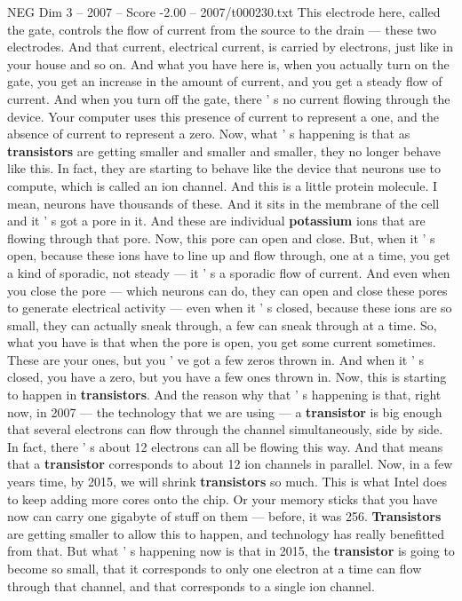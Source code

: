\begin{textsample}{NEG Dim 3 – 2007 – Score -2.00 – 2007/t000230.txt}
This electrode here, called the gate, controls the flow of current from the source to the drain — these two electrodes.
And that current, electrical current, is carried by electrons, just like in your house and so on.
And what you have here is, when you actually turn on the gate, you get an increase in the amount of current, and you get a steady flow of current.
And when you turn off the gate, there ' s no current flowing through the device.
Your computer uses this presence of current to represent a one, and the absence of current to represent a zero.
Now, what ' s happening is that as \textbf{transistors} are getting smaller and smaller and smaller, they no longer behave like this.
In fact, they are starting to behave like the device that neurons use to compute, which is called an ion channel.
And this is a little protein molecule.
I mean, neurons have thousands of these.
And it sits in the membrane of the cell and it ' s got a pore in it.
And these are individual \textbf{potassium} ions that are flowing through that pore.
Now, this pore can open and close.
But, when it ' s open, because these ions have to line up and flow through, one at a time, you get a kind of sporadic, not steady — it ' s a sporadic flow of current.
And even when you close the pore — which neurons can do, they can open and close these pores to generate electrical activity — even when it ' s closed, because these ions are so small, they can actually sneak through, a few can sneak through at a time.
So, what you have is that when the pore is open, you get some current sometimes.
These are your ones, but you ' ve got a few zeros thrown in.
And when it ' s closed, you have a zero, but you have a few ones thrown in.
Now, this is starting to happen in \textbf{transistors}.
And the reason why that ' s happening is that, right now, in 2007 — the technology that we are using — a \textbf{transistor} is big enough that several electrons can flow through the channel simultaneously, side by side.
In fact, there ' s about 12 electrons can all be flowing this way.
And that means that a \textbf{transistor} corresponds to about 12 ion channels in parallel.
Now, in a few years time, by 2015, we will shrink \textbf{transistors} so much.
This is what Intel does to keep adding more cores onto the chip.
Or your memory sticks that you have now can carry one gigabyte of stuff on them — before, it was 256. \textbf{Transistors} are getting smaller to allow this to happen, and technology has really benefitted from that.
But what ' s happening now is that in 2015, the \textbf{transistor} is going to become so small, that it corresponds to only one electron at a time can flow through that channel, and that corresponds to a single ion channel.

\end{textsample}
